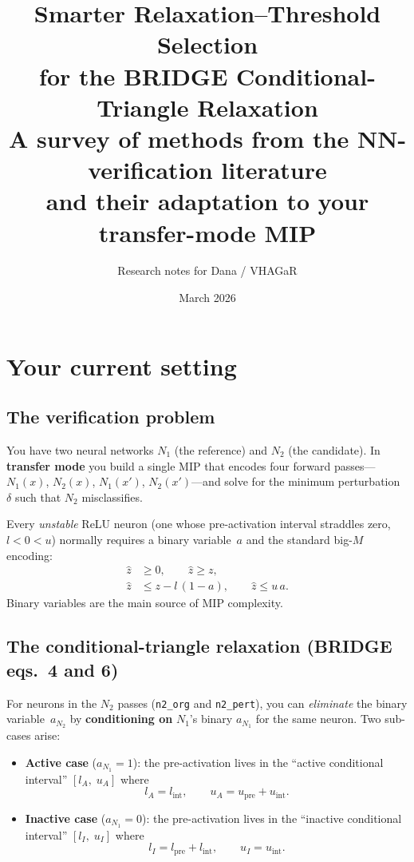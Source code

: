 \documentclass[11pt,a4paper]{article}
\title{Smarter Relaxation--Threshold Selection\\for the BRIDGE Conditional-Triangle Relaxation\\[6pt]
\large A survey of methods from the NN-verification literature\\and their adaptation to your transfer-mode MIP}
\author{Research notes for Dana / VHAGaR}
\date{March 2026}
\begin{document}
\maketitle
\tableofcontents
\newpage

\section{Your current setting}\label{sec:setting}

\subsection{The verification problem}

You have two neural networks $N_1$ (the reference) and $N_2$ (the candidate).
In \textbf{transfer mode} you build a single MIP that encodes four forward
passes---$N_1(x)$, $N_2(x)$, $N_1(x')$, $N_2(x')$---and solve for the
minimum perturbation $\delta$ such that $N_2$ misclassifies.

Every \emph{unstable} ReLU neuron (one whose pre-activation interval straddles
zero, $l<0<u$) normally requires a binary variable~$a$ and the standard
big-$M$ encoding:
\begin{align}
  \hat z &\ge 0, \qquad \hat z \ge z, \label{eq:relu-lb}\\
  \hat z &\le z - l\,(1 - a), \qquad \hat z \le u\,a. \label{eq:relu-ub}
\end{align}
Binary variables are the main source of MIP complexity.

\subsection{The conditional-triangle relaxation (BRIDGE eqs.~4 and 6)}

For neurons in the $N_2$ passes (\texttt{n2\_org} and \texttt{n2\_pert}), you
can \emph{eliminate} the binary variable~$a_{N_2}$ by \textbf{conditioning on}
$N_1$'s binary $a_{N_1}$ for the same neuron.  Two sub-cases arise:

\begin{itemize}[leftmargin=2em]
  \item \textbf{Active case} ($a_{N_1}=1$): the pre-activation lives in the
        ``active conditional interval'' $[l_A,\; u_A]$ where
        \[
          l_A = l_{\mathrm{int}}, \qquad
          u_A = u_{\mathrm{pre}} + u_{\mathrm{int}}.
        \]
  \item \textbf{Inactive case} ($a_{N_1}=0$): the pre-activation lives in the
        ``inactive conditional interval'' $[l_I,\; u_I]$ where
        \[
          l_I = l_{\mathrm{pre}} + l_{\mathrm{int}}, \qquad
          u_I = u_{\mathrm{int}}.
        \]
\end{itemize}
\end{document}
